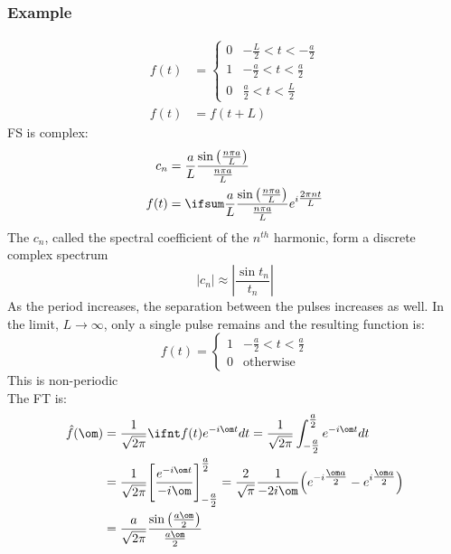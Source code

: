 \documentclass[a4paper, 11pt, normalem]{report}
\begin{document}
\subsection{Example}
\begin{align*}
    f(t) &=
    \begin{cases}
        0 & -\frac{L}{2} < t < -\frac{a}{2} \\
        1 & -\frac{a}{2} < t < \frac{a}{2}  \\
        0 & \frac{a}{2} < t < \frac{L}{2}
    \end{cases} \\
    f(t) &= f(t + L)
\end{align*}
FS is complex:
\begin{align*}
    c_n &= \frac{a}{L} \frac{\sin\big(\tfrac{n\pi a}{L}\big)}{\tfrac{n\pi a}{L}} \\
    f(t) &= \ifsum \frac{a}{L} \frac{\sin\big(\tfrac{n\pi a}{L}\big)}{\tfrac{n\pi a}{L}} e^{i\tfrac{2\pi nt}{L}}
\end{align*}
The $c_n$, called the spectral coefficient of the $n^{th}$ harmonic, form a discrete complex spectrum
\begin{equation*}
    |c_n| \approx |\frac{\sin t_n}{t_n}|
\end{equation*}
As the period increases, the separation between the pulses increases as well. In the limit, $L \to \infty$, only a single pulse remains and the resulting function is:
\begin{equation*}
    f(t) =
    \begin{cases}
        1 & -\frac{a}{2} < t < \frac{a}{2} \\
        0 & \text{otherwise}
    \end{cases}
\end{equation*}
This is non-periodic \\
The FT is:
\begin{align*}
    \hat{f}(\om) &= \frac{1}{\sqrt{2\pi}} \ifnt f(t)e^{-i\om t}dt = \frac{1}{\sqrt{2\pi}} \int_{-\tfrac{a}{2}}^{\tfrac{a}{2}} e^{-i\om t}dt \\
    &= \frac{1}{\sqrt{2\pi}} \Bigg[\frac{e^{-i\om t}}{-i\om} \Bigg]_{-\tfrac{a}{2}}^{\tfrac{a}{2}} = \frac{2}{\sqrt{\pi}} \frac{1}{-2i\om} \Big(e^{-i\tfrac{\om a}{2}} - e^{i\tfrac{\om a}{2}}\Big) \\
    &= \frac{a}{\sqrt{2\pi}} \frac{\sin\big(\tfrac{a\om}{2}\big)}{\tfrac{a\om}{2}}
\end{align*}

\chapter{}
\end{document}
